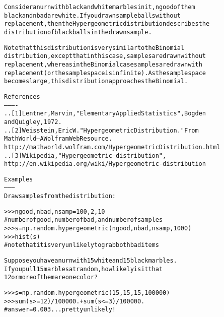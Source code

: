 \begin{boxedminipage}{\funcwidth}
\begin{alltt}
Consider an urn with black and white marbles in it, ngood of them
black and nbad are white. If you draw nsample balls without
replacement, then the Hypergeometric distribution describes the
distribution of black balls in the drawn sample.

Note that this distribution is very similar to the Binomial
distribution, except that in this case, samples are drawn without
replacement, whereas in the Binomial case samples are drawn with
replacement (or the sample space is infinite). As the sample space
becomes large, this distribution approaches the Binomial.

References
----------
.. [1] Lentner, Marvin, "Elementary Applied Statistics", Bogden
       and Quigley, 1972.
.. [2] Weisstein, Eric W. "Hypergeometric Distribution." From
       MathWorld--A Wolfram Web Resource.
       http://mathworld.wolfram.com/HypergeometricDistribution.html
.. [3] Wikipedia, "Hypergeometric-distribution",
       http://en.wikipedia.org/wiki/Hypergeometric-distribution

Examples
--------
Draw samples from the distribution:

{\textgreater}{\textgreater}{\textgreater} ngood, nbad, nsamp = 100, 2, 10
\# number of good, number of bad, and number of samples
{\textgreater}{\textgreater}{\textgreater} s = np.random.hypergeometric(ngood, nbad, nsamp, 1000)
{\textgreater}{\textgreater}{\textgreater} hist(s)
\#   note that it is very unlikely to grab both bad items

Suppose you have an urn with 15 white and 15 black marbles.
If you pull 15 marbles at random, how likely is it that
12 or more of them are one color?

{\textgreater}{\textgreater}{\textgreater} s = np.random.hypergeometric(15, 15, 15, 100000)
{\textgreater}{\textgreater}{\textgreater} sum(s{\textgreater}=12)/100000. + sum(s{\textless}=3)/100000.
\#   answer = 0.003 ... pretty unlikely!
\end{alltt}

\setlength{\parskip}{1ex}
    \end{boxedminipage}

    \label{QSTK:qstklearn:mldiagnostics:laplace}

    \vspace{0.5ex}

